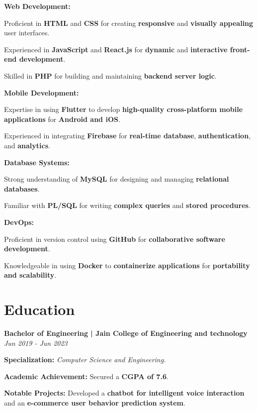 \documentclass[a4paper,11pt]{article}
\begin{document}
\textbf{Web Development:} 
\begin{compactitem}
    \item Proficient in \textbf{HTML} and \textbf{CSS} for creating \textbf{responsive} and \textbf{visually appealing} user interfaces.
    \item Experienced in \textbf{JavaScript} and \textbf{React.js} for \textbf{dynamic} and \textbf{interactive front-end development}.
    \item Skilled in \textbf{PHP} for building and maintaining \textbf{backend server logic}.
\end{compactitem}

\textbf{Mobile Development:} 
\begin{compactitem}
    \item Expertise in using \textbf{Flutter} to develop \textbf{high-quality cross-platform mobile applications} for \textbf{Android and iOS}.
    \item Experienced in integrating \textbf{Firebase} for \textbf{real-time database}, \textbf{authentication}, and \textbf{analytics}.
\end{compactitem}

\textbf{Database Systems:} 
\begin{compactitem}
    \item Strong understanding of \textbf{MySQL} for designing and managing \textbf{relational databases}.
    \item Familiar with \textbf{PL/SQL} for writing \textbf{complex queries} and \textbf{stored procedures}.
\end{compactitem}

\textbf{DevOps:} 
\begin{compactitem}
    \item Proficient in version control using \textbf{GitHub} for \textbf{collaborative software development}.
    \item Knowledgeable in using \textbf{Docker} to \textbf{containerize applications} for \textbf{portability and scalability}.
\end{compactitem}

\section*{Education}

\textbf{Bachelor of Engineering | Jain College of Engineering and technology} \hfill \textit{Jun 2019 - Jun 2023} \\
\begin{compactitem}
    \item \textbf{Specialization:} \textit{Computer Science and Engineering.}
    \item \textbf{Academic Achievement:} Secured a \textbf{CGPA of 7.6}.
    \item \textbf{Notable Projects:} Developed a \textbf{chatbot for intelligent voice interaction} and an \textbf{e-commerce user behavior prediction system}.
\end{compactitem}
\end{document}
